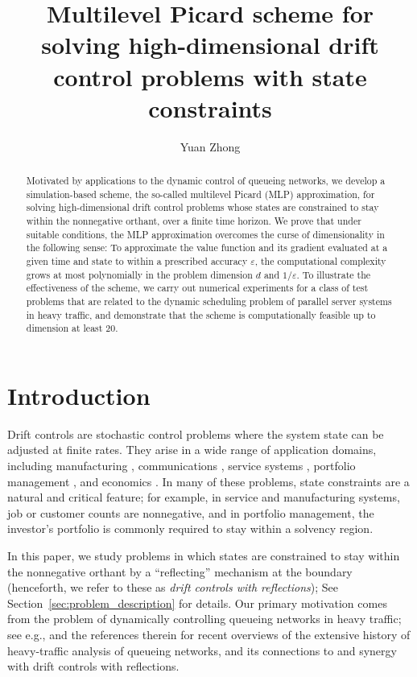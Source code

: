 \documentclass[11pt]{article}
\title{Multilevel Picard scheme for solving high-dimensional drift control problems with state constraints}
\author{Yuan Zhong}
\date{}
\theoremstyle{definition}
\theoremstyle{plain}
\newcommand{\veps}{\varepsilon}
\begin{document}
\onehalfspacing
\maketitle

\begin{abstract}
Motivated by applications to the dynamic control of queueing networks, 
we develop a simulation-based scheme, the so-called multilevel Picard (MLP) approximation, 
for solving high-dimensional drift control problems whose states 
are constrained to stay within the nonnegative orthant, over a finite time horizon. 
We prove that under suitable conditions, the MLP approximation overcomes 
the curse of dimensionality in the following sense: To approximate 
the value function and its gradient evaluated at a given time and state to  
within a prescribed accuracy $\veps$, the computational complexity 
grows at most polynomially in the problem dimension $d$ and $1/\veps$. 
To illustrate the effectiveness of the scheme, we carry out numerical experiments for 
a class of test problems that are related to the dynamic scheduling problem of parallel server systems in heavy traffic, 
and demonstrate that the scheme is computationally feasible up to dimension at least $20$.
\end{abstract}

\section{Introduction}\label{sec:introduction}
Drift controls are stochastic control problems where the system state can be adjusted at finite rates. 
They arise in a wide range of application domains, including manufacturing \cite{RubinoAta2009, OrmeciMatogluVandeVate2011}, communications \cite{AtaHarrisonShepp2005}, 
service systems \cite{Atar2005, atar2004scheduling, kim2018dynamic}, portfolio management \cite{DaiZhong2010}, and economics \cite{BarIlanMarionPerry2007}. 
In many of these problems, state constraints are a natural and critical feature; 
for example, in service and manufacturing systems, job or customer counts are nonnegative, 
and in portfolio management, the investor's portfolio is commonly required to stay within a solvency region. 

In this paper, we study problems in which states are constrained to stay within the nonnegative orthant 
by a ``reflecting'' mechanism at the boundary 
(henceforth, we refer to these as {\em drift controls with reflections}); See Section~\ref{sec:problem_description} for details.
Our primary motivation comes from the problem of dynamically controlling queueing networks in heavy traffic; 
see e.g., \cite{AtaHarrisonSi2024,williams2016stochastic} and the references therein for recent overviews of 
the extensive history of heavy-traffic analysis of queueing networks, 
and its connections to and synergy with drift controls with reflections.
\end{document}
